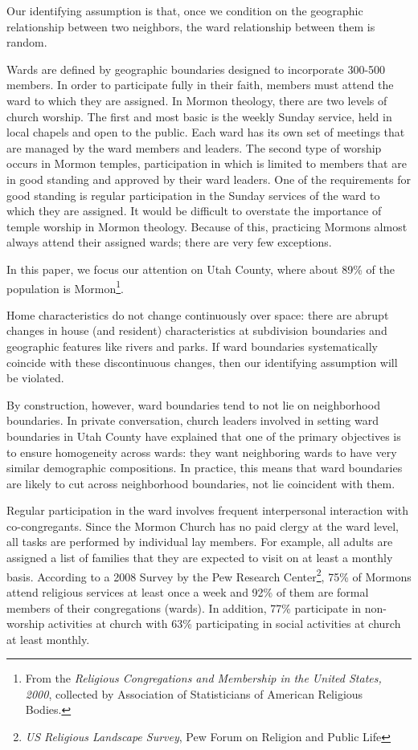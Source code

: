 \documentclass[12pt]{article}
\begin{document}
    Our identifying assumption is that, once we condition on the geographic relationship between two neighbors, the ward relationship between them is
    random.

    Wards are defined by geographic boundaries designed to incorporate 300-500 members. In order to participate fully in their faith, members must
    attend the ward to which they are assigned. In Mormon theology, there are two levels of church worship. The first and most basic is the weekly
    Sunday service, held in local chapels and open to the public. Each ward has its own set of meetings that are managed by the ward members and
    leaders. The second type of worship occurs in Mormon temples, participation in which is limited to members that are in good standing and approved
    by their ward leaders. One of the requirements for good standing is regular participation in the Sunday services of the ward to which they are
    assigned. It would be difficult to overstate the importance of temple worship in Mormon theology. Because of this, practicing Mormons almost
    always attend their assigned wards; there are very few exceptions.

    In this paper, we focus our attention on Utah County, where about 89\% of the population is
    Mormon\footnote{From the \emph{Religious Congregations and Membership in the United States, 2000}, collected by Association of Statisticians of
    American Religious Bodies.}.

    Home characteristics do not change continuously over space: there are abrupt changes in house (and resident) characteristics at subdivision
    boundaries and geographic features like rivers and parks. If ward boundaries systematically coincide with these discontinuous changes, then our
    identifying assumption will be violated.

    By construction, however, ward boundaries tend to not lie on neighborhood boundaries. In private conversation, church leaders involved in setting
    ward boundaries in Utah County have explained that one of the primary objectives is to ensure homogeneity across wards: they want neighboring
    wards to have very similar demographic compositions. In practice, this means that ward boundaries are likely to cut across neighborhood
    boundaries, not lie coincident with them.

    Regular participation in the ward involves frequent interpersonal interaction with co-congregants. Since the Mormon Church has no paid clergy at
    the ward level, all tasks are performed by individual lay members. For example, all adults are assigned a list of families that they are expected
    to visit on at least a monthly basis. According to a 2008 Survey by the Pew Research Center\footnote{\emph{US Religious Landscape Survey}, Pew
    Forum on Religion and Public Life}, 75\% of Mormons attend religious services at least once a week and 92\% of them are formal members of their
    congregations (wards). In addition, 77\% participate in non-worship activities at church with 63\% participating in social activities at church at
    least monthly.
    
\end{document}
